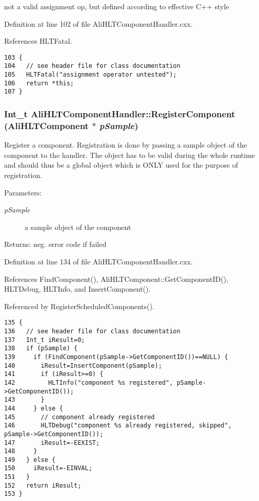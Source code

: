 not a valid assignment op, but defined according to effective C++ style 

Definition at line 102 of file Ali\-HLTComponent\-Handler.cxx.

References HLTFatal.

\footnotesize\begin{verbatim}103 { 
104   // see header file for class documentation
105   HLTFatal("assignment operator untested");
106   return *this;
107 }
\end{verbatim}\normalsize 


\subsubsection{\setlength{\rightskip}{0pt plus 5cm}Int\_\-t Ali\-HLTComponent\-Handler::Register\-Component ({\bf Ali\-HLTComponent} $\ast$ {\em p\-Sample})}\label{classAliHLTComponentHandler_a10}


Register a component. Registration is done by passing a sample object of the component to the handler. The object has to be valid during the whole runtime and should thus be a global object which is ONLY used for the purpose of registration. \begin{Desc}
\item[Parameters:]
\begin{description}
\item[{\em p\-Sample}]a sample object of the component \end{description}
\end{Desc}
\begin{Desc}
\item[Returns:]neg. error code if failed \end{Desc}


Definition at line 134 of file Ali\-HLTComponent\-Handler.cxx.

References Find\-Component(), Ali\-HLTComponent::Get\-Component\-ID(), HLTDebug, HLTInfo, and Insert\-Component().

Referenced by Register\-Scheduled\-Components().

\footnotesize\begin{verbatim}135 {
136   // see header file for class documentation
137   Int_t iResult=0;
138   if (pSample) {
139     if (FindComponent(pSample->GetComponentID())==NULL) {
140       iResult=InsertComponent(pSample);
141       if (iResult>=0) {
142         HLTInfo("component %s registered", pSample->GetComponentID());
143       }
144     } else {
145       // component already registered
146       HLTDebug("component %s already registered, skipped", pSample->GetComponentID());
147       iResult=-EEXIST;
148     }
149   } else {
150     iResult=-EINVAL;
151   }
152   return iResult;
153 }
\end{verbatim}\normalsize 


